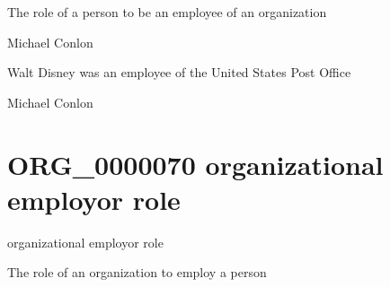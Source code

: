 \documentclass[letterpaper,10pt,english]{sphinxmanual}
\begin{document}
\begin{sphinxShadowBox}

\sphinxAtStartPar
The role of a person to be an employee of an organization
\end{sphinxShadowBox}

\begin{sphinxShadowBox}

\sphinxAtStartPar
Michael Conlon 
\end{sphinxShadowBox}

\begin{sphinxShadowBox}

\sphinxAtStartPar
Walt Disney was an employee of the United States Post Office
\end{sphinxShadowBox}

\begin{sphinxShadowBox}

\sphinxAtStartPar
Michael Conlon 
\end{sphinxShadowBox}
\begin{quote}
\label{\detokenize{doc-ORG_0000070:org-0000070}}\label{\detokenize{doc-ORG_0000070:organizational-employor-role}}\label{\detokenize{doc-ORG_0000070:org-0000070}}
\ignorespaces \end{quote}


\section{ORG\_0000070 \sphinxhyphen{} organizational employor role}
\label{\detokenize{doc-ORG_0000070:org-0000070-organizational-employor-role}}\label{\detokenize{doc-ORG_0000070:index-0}}\label{\detokenize{doc-ORG_0000070::doc}}
\begin{sphinxShadowBox}

\sphinxAtStartPar
organizational employor role
\end{sphinxShadowBox}

\begin{sphinxShadowBox}

\sphinxAtStartPar
The role of an organization to employ a person
\end{sphinxShadowBox}
\end{document}

